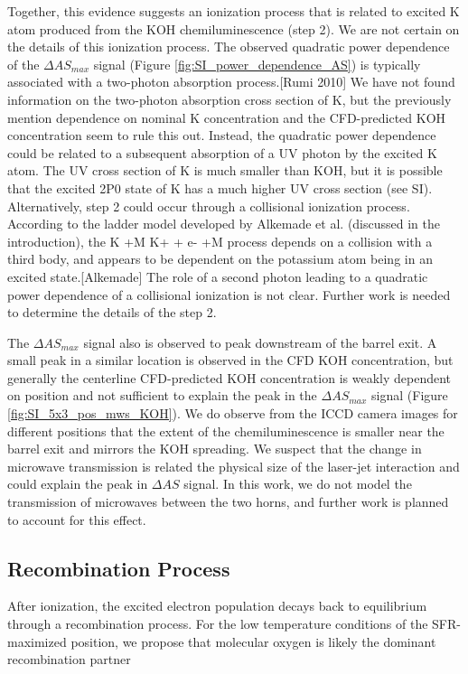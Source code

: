 Together, this evidence suggests an ionization process that is related to excited K atom produced from the KOH chemiluminescence (step 2). We are not certain on the details of this ionization process. The observed quadratic power dependence of the $\Delta AS_{max}$ signal (Figure \ref*{fig:SI_power_dependence_AS}) is typically associated with a two-photon absorption process.[Rumi 2010] We have not found information on the two-photon absorption cross section of K, but the previously mention dependence on nominal K concentration and the CFD-predicted KOH concentration seem to rule this out. Instead, the quadratic power dependence could be related to a subsequent absorption of a UV photon by the excited K atom. The UV cross section of K is much smaller than KOH, but it is possible that the excited 2P0 state of K has a much higher UV cross section (see SI). Alternatively, step 2 could occur through a collisional ionization process. According to the ladder model developed by Alkemade et al. (discussed in the introduction), the K +M \rightarrow K+ + e- +M process depends on a collision with a third body, and appears to be dependent on the potassium atom being in an excited state.[Alkemade] The role of a second photon leading to a quadratic power dependence of a collisional ionization is not clear.  Further work is needed to determine the details of the step 2. 

The $\Delta AS_{max}$ signal also is observed to peak downstream of the barrel exit. A small peak in a similar location is observed in the CFD KOH concentration, but generally the centerline CFD-predicted KOH concentration is weakly dependent on position and not sufficient to explain the peak in the $\Delta AS_{max}$ signal (Figure \ref*{fig:SI_5x3_pos_mws_KOH}). We do observe from the ICCD camera images for different positions that the extent of the chemiluminescence is smaller near the barrel exit and mirrors the KOH spreading. We suspect that the change in microwave transmission is related the physical size of the laser-jet interaction and could explain the peak in $\Delta AS$ signal. In this work, we do not model the transmission of microwaves between the two horns, and further work is planned to account for this effect.

\subsection{Recombination Process}

After ionization, the excited electron population decays back to equilibrium through a recombination process. For the low temperature conditions of the SFR-maximized position, we propose that molecular oxygen is likely the dominant recombination partner

